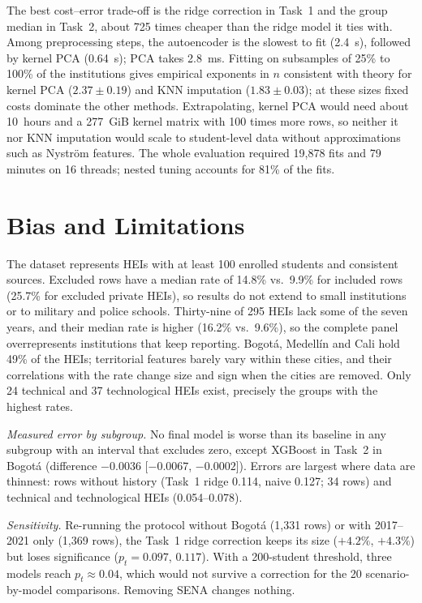 \documentclass[conference]{IEEEtran}
\begin{document}
The best cost--error trade-off is the ridge correction in Task~1 and the group median in Task~2, about 725 times cheaper than the ridge model it ties with. Among preprocessing steps, the autoencoder is the slowest to fit (2.4~s), followed by kernel PCA (0.64~s); PCA takes 2.8~ms. Fitting on subsamples of 25\% to 100\% of the institutions gives empirical exponents in $n$ consistent with theory for kernel PCA ($2.37\pm0.19$) and KNN imputation ($1.83\pm0.03$); at these sizes fixed costs dominate the other methods. Extrapolating, kernel PCA would need about 10~hours and a 277~GiB kernel matrix with 100 times more rows, so neither it nor KNN imputation would scale to student-level data without approximations such as Nystr\"om features. The whole evaluation required 19,878 fits and 79 minutes on 16 threads; nested tuning accounts for 81\% of the fits.

\section{Bias and Limitations}\label{sec:bias}

The dataset represents HEIs with at least 100 enrolled students and consistent sources. Excluded rows have a median rate of 14.8\% vs.\ 9.9\% for included rows (25.7\% for excluded private HEIs), so results do not extend to small institutions or to military and police schools. Thirty-nine of 295 HEIs lack some of the seven years, and their median rate is higher (16.2\% vs.\ 9.6\%), so the complete panel overrepresents institutions that keep reporting. Bogot\'a, Medell\'in and Cali hold 49\% of the HEIs; territorial features barely vary within these cities, and their correlations with the rate change size and sign when the cities are removed. Only 24 technical and 37 technological HEIs exist, precisely the groups with the highest rates.

\emph{Measured error by subgroup.} No final model is worse than its baseline in any subgroup with an interval that excludes zero, except XGBoost in Task~2 in Bogot\'a (difference $-0.0036$ [$-0.0067$, $-0.0002$]). Errors are largest where data are thinnest: rows without history (Task~1 ridge 0.114, naive 0.127; 34 rows) and technical and technological HEIs (0.054--0.078).

\emph{Sensitivity.} Re-running the protocol without Bogot\'a (1,331 rows) or with 2017--2021 only (1,369 rows), the Task~1 ridge correction keeps its size ($+4.2\%$, $+4.3\%$) but loses significance ($p_t=0.097$, $0.117$). With a 200-student threshold, three models reach $p_t\approx0.04$, which would not survive a correction for the 20 scenario-by-model comparisons. Removing SENA changes nothing.
\end{document}
